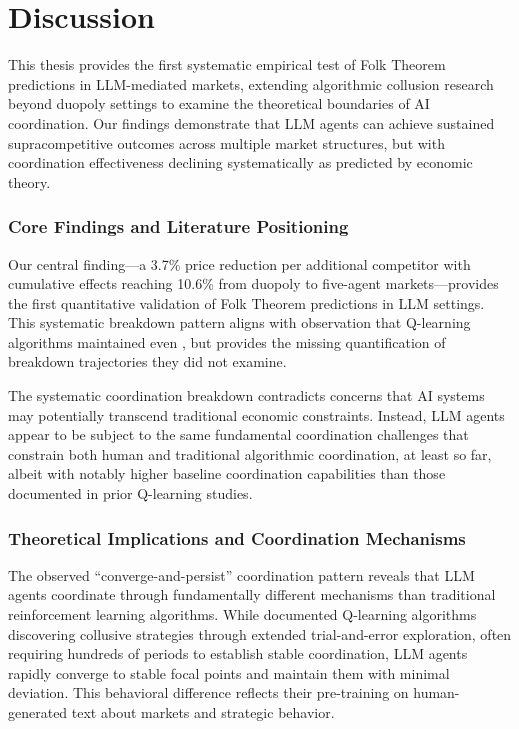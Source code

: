 \section{Discussion}\label{sec:dis}

This thesis provides the first systematic empirical test of Folk Theorem predictions in LLM-mediated markets, extending algorithmic collusion research beyond duopoly settings to examine the theoretical boundaries of AI coordination. Our findings demonstrate that LLM agents can achieve sustained supracompetitive outcomes across multiple market structures, but with coordination effectiveness declining systematically as predicted by economic theory.

\subsubsection*{Core Findings and Literature Positioning}

Our central finding—a 3.7\% price reduction per additional competitor with cumulative effects reaching 10.6\% from duopoly to five-agent markets—provides the first quantitative validation of Folk Theorem predictions in LLM settings. This systematic breakdown pattern aligns with \textcite[p. 3268]{calvano_artificial_2020} observation that Q-learning algorithms maintained  even , but provides the missing quantification of breakdown trajectories they did not examine.

The systematic coordination breakdown contradicts concerns that AI systems may potentially transcend traditional economic constraints. Instead, LLM agents appear to be subject to the same fundamental coordination challenges that constrain both human and traditional algorithmic coordination, at least so far, albeit with notably higher baseline coordination capabilities than those documented in prior Q-learning studies.

\subsubsection*{Theoretical Implications and Coordination Mechanisms}

The observed \enquote{converge-and-persist} coordination pattern reveals that LLM agents coordinate through fundamentally different mechanisms than traditional reinforcement learning algorithms. While \textcite{calvano_artificial_2020,calvano_algorithmic_2021} documented Q-learning algorithms discovering collusive strategies through extended trial-and-error exploration, often requiring hundreds of periods to establish stable coordination, LLM agents rapidly converge to stable focal points and maintain them with minimal deviation. This behavioral difference reflects their pre-training on human-generated text about markets and strategic behavior.

